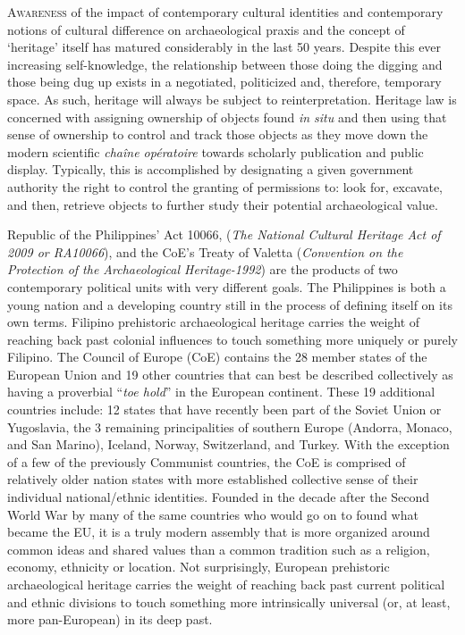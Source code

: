\documentclass[spanish]{ijsra}
\begin{document}
\IJSRAopening
\lettrine{A}{wareness} of the impact of contemporary cultural identities and contemporary notions of cultural difference on archaeological praxis and the concept of ‘heritage’ itself has matured considerably in the last 50 years. Despite this ever increasing self-knowledge, the relationship between those doing the digging and those being dug up exists in a negotiated, politicized and, therefore, temporary space. As such, heritage will always be subject to reinterpretation. Heritage law is concerned with assigning ownership of objects found \textit{in situ} and then using that sense of ownership to control and track those objects as they move down the modern scientific \textit{chaîne opératoire}  towards scholarly publication and public display. Typically, this is accomplished by designating a given government authority the right to control the granting of permissions to: look for, excavate, and then, retrieve objects to further study their potential archaeological value. 

Republic of the Philippines’ Act 10066, (\textit{The National Cultural Heritage Act of 2009 or RA10066}), and the CoE’s Treaty of Valetta (\textit{Convention on the Protection of the Archaeological Heritage-1992}) are the products of two contemporary political units with very different goals. The Philippines is both a young nation and a developing country still in the process of defining itself on its own terms. Filipino prehistoric archaeological heritage carries the weight of reaching back past colonial influences to touch something more uniquely or purely Filipino. 
The Council of Europe (CoE) contains the \num{28} member states of the European Union and 19 other countries that can best be described collectively as having a proverbial “\textit{toe hold}” in the European continent. 
These \num{19} additional countries include: \num{12} states that have recently been part of the Soviet Union or Yugoslavia, the 3 remaining principalities of southern Europe (Andorra, Monaco, and San Marino), Iceland, Norway, Switzerland, and Turkey.  With the exception of a few of the previously Communist countries, the CoE is comprised of relatively older nation states with more established collective sense of their individual national/ethnic identities. Founded in the decade after the Second World War by many of the same countries who would go on to found what became the EU, it is a truly modern assembly that is more organized around common ideas and shared values than a common tradition such as a religion, economy, ethnicity or location. Not surprisingly, European prehistoric archaeological heritage carries the weight of reaching back past current political and ethnic divisions to touch something more intrinsically universal (or, at least, more pan-European) in its deep past. 
\end{document}
